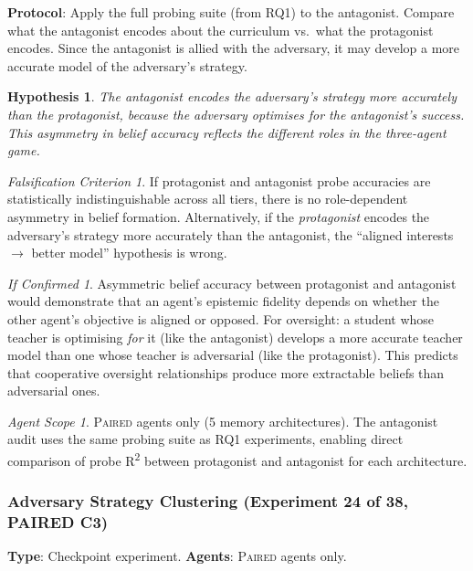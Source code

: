 \documentclass[11pt,a4paper]{article}
\newtheorem{hypothesis}{Hypothesis}[subsection]
\theoremstyle{remark}
\newtheorem*{falsification}{Falsification Criterion}
\newtheorem*{implication}{If Confirmed}
\newtheorem*{agentscope}{Agent Scope}
\newcommand{\paired}{\textsc{Paired}}
\begin{document}
\textbf{Protocol}: Apply the full probing suite (from RQ1) to the antagonist. Compare what the antagonist encodes about the curriculum vs.\ what the protagonist encodes. Since the antagonist is allied with the adversary, it may develop a more accurate model of the adversary's strategy.

\begin{hypothesis}
The antagonist encodes the adversary's strategy more accurately than the protagonist, because the adversary optimises for the antagonist's success. This asymmetry in belief accuracy reflects the different roles in the three-agent game.
\end{hypothesis}

\begin{falsification}
If protagonist and antagonist probe accuracies are statistically indistinguishable across all tiers, there is no role-dependent asymmetry in belief formation. Alternatively, if the \textit{protagonist} encodes the adversary's strategy more accurately than the antagonist, the ``aligned interests $\to$ better model'' hypothesis is wrong.
\end{falsification}

\begin{implication}
Asymmetric belief accuracy between protagonist and antagonist would demonstrate that an agent's epistemic fidelity depends on whether the other agent's objective is aligned or opposed. For oversight: a student whose teacher is optimising \textit{for} it (like the antagonist) develops a more accurate teacher model than one whose teacher is adversarial (like the protagonist). This predicts that cooperative oversight relationships produce more extractable beliefs than adversarial ones.
\end{implication}

\begin{agentscope}
\paired{} agents only (5 memory architectures). The antagonist audit uses the same probing suite as RQ1 experiments, enabling direct comparison of probe R\textsuperscript{2} between protagonist and antagonist for each architecture.
\end{agentscope}

\subsubsection{Adversary Strategy Clustering (Experiment 24 of 38, PAIRED C3)}
\label{exp:adversary_strategy_clustering}

\textbf{Type}: Checkpoint experiment. \textbf{Agents}: \paired{} agents only.
\end{document}
